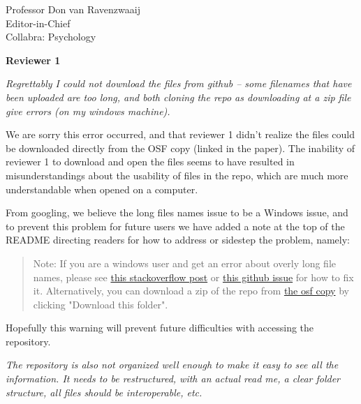 \documentclass{stanfordletter}
\newcounter{section}
\newcommand{\section}[1]{
	\bigskip
	{\normalfont\Large\bfseries #1}}
\newcommand{\theysaid}[1]{\begin{leftbar} \noindent 
		\textsl{ #1}\end{leftbar}}
\newcommand{\revised}[1]{\begin{quote}	#1 \end{quote}}
\begin{document}
\begin{letter}{Professor Don van Ravenzwaaij \\ Editor-in-Chief \\ Collabra: Psychology }
	
	\section{Reviewer 1}
	
	
	
	\theysaid{Regrettably I could not download the files from github – some filenames that have been uploaded are too long, and both cloning the repo as downloading at a zip file give errors (on my windows machine). }
	
	We are sorry this error occurred, and that reviewer 1 didn't realize the files could be downloaded directly from the OSF copy (linked in the paper).  The inability of reviewer 1 to download and open the files seems to have resulted in misunderstandings about the usability of files in the repo, which are much more understandable when opened on a computer.
	
	From googling, we believe the long files names issue to be a Windows issue, and to prevent this problem for future users we have added a note at the top of the README directing readers for how to address or sidestep the problem, namely:
	
	\revised{Note: If you are a windows user and get an error about overly long file names, please see \href{https://stackoverflow.com/questions/22575662/filename-too-long-in-git-for-windows}{this stackoverflow post} or \href{https://github.com/desktop/desktop/issues/17882} {this github issue} for how to fix it. Alternatively, you can download a zip of the repo from \href{https://osf.io/cyk5w/files/github}{the osf copy} by clicking "Download this folder".}
	
	Hopefully this warning will prevent future difficulties with accessing the repository. 
	
	\theysaid{The repository is also not organized well enough to make it easy to see all the information. It needs to be restructured, with an actual read me, a clear folder structure, all files should be interoperable, etc. 
	}
	

\end{letter}
\end{document}
